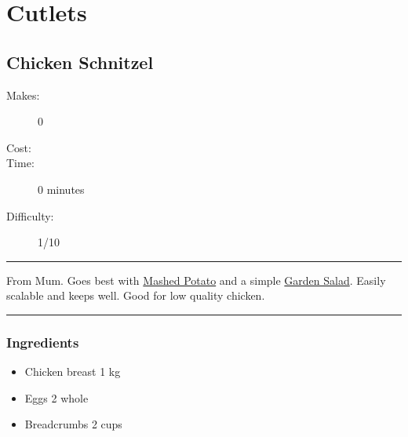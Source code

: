 \documentclass[]{article}
\begin{document}
\section*{\center\Huge\color{accent}Cutlets}
\label{cat:Cutlets}
\label{rec:Chicken Schnitzel}
\subsection*{\center\huge Chicken Schnitzel}
\begin{description}
\item[Makes:] 0 
\item[Cost:] \textdollar
\item[Time:] 0 minutes
\item[Difficulty:] 1/10
\end{description}
\vspace{0.2cm}\hrule\vspace{0.5cm}
\begin{adjustwidth}{0.5 cm}{0.5 cm}

From Mum. Goes best with \hyperref[rec:Mashed Potato]{Mashed Potato} and a simple \hyperref[rec:Garden Salad]{Garden Salad}. Easily scalable and keeps well. Good for low quality chicken. \hfill{}\color{black}

\end{adjustwidth}
\vspace{0.5cm}\hrule
\subsubsection*{\Large Ingredients}
\begin{multicols}{2}
\begin{itemize}
 \item Chicken breast \hfill 1 kg
 \item Eggs \hfill 2 whole
 \item Breadcrumbs \hfill 2 cups
\end{itemize}
\end{multicols}
\end{document}

